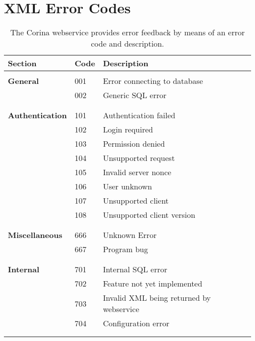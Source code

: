 \chapter{XML Error Codes}
\label{txt:errorcodes}
\begin{longtable}{lll}
  \caption{The Corina webservice provides error feedback by means of an error code and description.}\\
  \toprule
  \textbf{Section} & \textbf{Code} & \textbf{Description} \\
  \endhead
  \midrule
  & & \\

  \textbf{General}
  & 001 & Error connecting to database \\
  & 002 & Generic SQL error \\
  
  & & \\
  \midrule
  & & \\
  
  \textbf{Authentication}
  & 101 & Authentication failed \\
  & 102 & Login required \\
  & 103 & Permission denied \\
  & 104 & Unsupported request \\
  & 105 & Invalid server nonce \\
  & 106 & User unknown \\
  & 107 & Unsupported client \\
  & 108 & Unsupported client version \\

  & & \\
  \midrule
  & & \\

  \textbf{Miscellaneous} 
  & 666 & Unknown Error \\
  & 667 & Program bug \\

  & & \\
  \midrule
  & & \\

  \textbf{Internal} 
  & 701 & Internal SQL error \\
  & 702 & Feature not yet implemented \\
  & 703 & Invalid XML being returned by webservice \\
  & 704 & Configuration error \\

  & & \\
  \midrule
  & & \\


\end{longtable}
